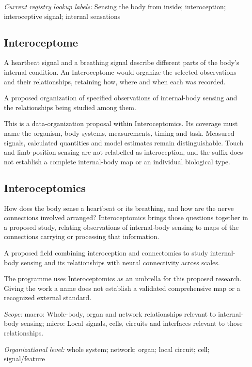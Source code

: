 \noindent\textit{Current registry lookup labels:} Sensing the body from inside; interoception; interoceptive signal; internal sensations\par

\subsection*{Interoceptome}
\noindent A heartbeat signal and a breathing signal describe different parts of the body’s internal condition. An Interoceptome would organize the selected observations and their relationships, retaining how, where and when each was recorded.\par
\noindent A proposed organization of specified observations of internal-body sensing and the relationships being studied among them.\par
\noindent This is a data-organization proposal within Interoceptomics. Its coverage must name the organism, body systems, measurements, timing and task. Measured signals, calculated quantities and model estimates remain distinguishable. Touch and limb-position sensing are not relabelled as interoception, and the suffix does not establish a complete internal-body map or an individual biological type.\par

\begin{samepage}
\subsection*{Interoceptomics}
\noindent How does the body sense a heartbeat or its breathing, and how are the nerve connections involved arranged? Interoceptomics brings those questions together in a proposed study, relating observations of internal-body sensing to maps of the connections carrying or processing that information.\par
\end{samepage}
\noindent A proposed field combining interoception and connectomics to study internal-body sensing and its relationships with neural connectivity across scales.\par
\noindent The programme uses Interoceptomics as an umbrella for this proposed research. Giving the work a name does not establish a validated comprehensive map or a recognized external standard.\par
\noindent\textit{Scope:} macro: Whole-body, organ and network relationships relevant to internal-body sensing; micro: Local signals, cells, circuits and interfaces relevant to those relationships.\par
\begin{samepage}
\noindent\textit{Organizational level:} whole system; network; organ; local circuit; cell; signal/feature\par\nopagebreak[4]
\nopagebreak[4]
\end{samepage}


